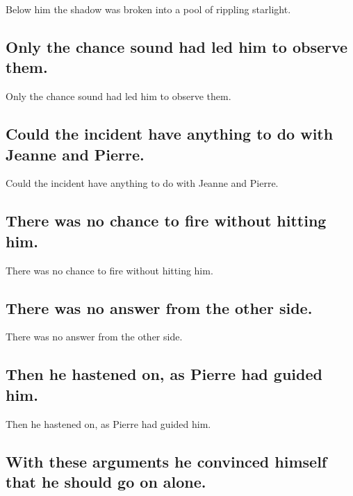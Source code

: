 \documentclass[]{article}
\begin{document}
Below him the shadow was broken into a pool of rippling starlight.

\hypertarget{only-the-chance-sound-had-led-him-to-observe-them.}{%
\subsection{Only the chance sound had led him to observe
them.}\label{only-the-chance-sound-had-led-him-to-observe-them.}}

Only the chance sound had led him to observe them.

\hypertarget{could-the-incident-have-anything-to-do-with-jeanne-and-pierre.}{%
\subsection{Could the incident have anything to do with Jeanne and
Pierre.}\label{could-the-incident-have-anything-to-do-with-jeanne-and-pierre.}}

Could the incident have anything to do with Jeanne and Pierre.

\hypertarget{there-was-no-chance-to-fire-without-hitting-him.}{%
\subsection{There was no chance to fire without hitting
him.}\label{there-was-no-chance-to-fire-without-hitting-him.}}

There was no chance to fire without hitting him.

\hypertarget{there-was-no-answer-from-the-other-side.}{%
\subsection{There was no answer from the other
side.}\label{there-was-no-answer-from-the-other-side.}}

There was no answer from the other side.

\hypertarget{then-he-hastened-on-as-pierre-had-guided-him.}{%
\subsection{Then he hastened on, as Pierre had guided
him.}\label{then-he-hastened-on-as-pierre-had-guided-him.}}

Then he hastened on, as Pierre had guided him.

\hypertarget{with-these-arguments-he-convinced-himself-that-he-should-go-on-alone.}{%
\subsection{With these arguments he convinced himself that he should go
on
alone.}\label{with-these-arguments-he-convinced-himself-that-he-should-go-on-alone.}}
\end{document}
